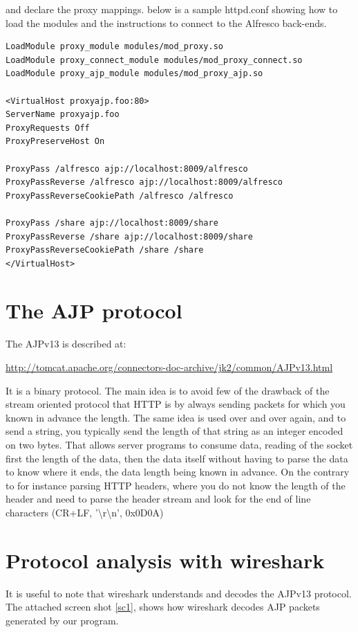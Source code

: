 \documentclass[12pt,a4]{article}
\begin{document}
and declare the proxy mappings. below is a sample httpd.conf showing how to load the modules and the instructions to connect to the Alfresco back-ends.


\begin{verbatim}
LoadModule proxy_module modules/mod_proxy.so
LoadModule proxy_connect_module modules/mod_proxy_connect.so
LoadModule proxy_ajp_module modules/mod_proxy_ajp.so

<VirtualHost proxyajp.foo:80>
ServerName proxyajp.foo
ProxyRequests Off
ProxyPreserveHost On

ProxyPass /alfresco ajp://localhost:8009/alfresco
ProxyPassReverse /alfresco ajp://localhost:8009/alfresco
ProxyPassReverseCookiePath /alfresco /alfresco

ProxyPass /share ajp://localhost:8009/share
ProxyPassReverse /share ajp://localhost:8009/share
ProxyPassReverseCookiePath /share /share
</VirtualHost>
\end{verbatim}


\section{The AJP protocol}
The AJPv13 is described at:

\url{http://tomcat.apache.org/connectors-doc-archive/jk2/common/AJPv13.html}

It is a binary protocol. The main idea is to avoid few of the drawback of the stream oriented protocol that HTTP is by always sending packets for which you known in advance the length.
The same idea is used over and over again, and to send a string, you typically send the length of that string as an integer encoded on two bytes. That allows server programs to consume data, reading of the socket first the length of the data, then the data itself without having to parse the data to know where it ends, the data length being known in advance.
On the contrary to for instance parsing HTTP headers, where you do not know the length of the header and need to parse the header stream and look for the end of line characters (CR+LF, '\textbackslash r\textbackslash n', 0x0D0A)\cite{newline}



\section{Protocol analysis with wireshark}
It is useful to note that wireshark understands and decodes the AJPv13 protocol. The attached screen shot \ref{sc1}, shows how wireshark decodes AJP packets generated by our program.
\end{document}
